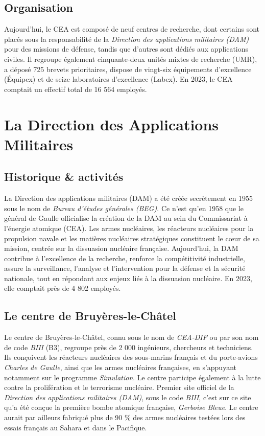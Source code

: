 \documentclass[12pt,a4paper]{report}
\begin{document}
\subsection{Organisation}
Aujourd'hui, le CEA est composé de neuf centres de recherche, dont certains sont placés sous la responsabilité de la \textit{Direction des applications militaires (DAM)} pour des missions de défense, tandis que d'autres sont dédiés aux applications civiles. Il regroupe également cinquante-deux unités mixtes de recherche (UMR), a déposé 725 brevets prioritaires, dispose de vingt-six équipements d’excellence (Équipex) et de seize laboratoires d’excellence (Labex). En 2023, le CEA comptait un effectif total de 16 564 employés.

\section{La Direction des Applications Militaires}
\subsection{Historique \& activités}
La Direction des applications militaires (DAM) a été créée secrètement en 1955 sous le nom de \textit{Bureau d'études générales (BEG)}. Ce n'est qu'en 1958 que le général de Gaulle officialise la création de la DAM au sein du Commissariat à l'énergie atomique (CEA). Les armes nucléaires, les réacteurs nucléaires pour la propulsion navale et les matières nucléaires stratégiques constituent le cœur de sa mission, centrée sur la dissuasion nucléaire française.
Aujourd'hui, la DAM contribue à l'excellence de la recherche, renforce la compétitivité industrielle, assure la surveillance, l'analyse et l'intervention pour la défense et la sécurité nationale, tout en répondant aux enjeux liés à la dissuasion nucléaire. En 2023, elle comptait près de 4 802 employés.
\subsection{Le centre de Bruyères-le-Châtel}
Le centre de Bruyères-le-Châtel, connu sous le nom de \textit{CEA-DIF} ou par son nom de code \textit{BIII} (B3), regroupe près de 2 000 ingénieurs, chercheurs et techniciens. Ils conçoivent les réacteurs nucléaires des sous-marins français et du porte-avions \textit{Charles de Gaulle}, ainsi que les armes nucléaires françaises, en s’appuyant notamment sur le programme \textit{Simulation}. Le centre participe également à la lutte contre la prolifération et le terrorisme nucléaire.
Premier site officiel de la \textit{Direction des applications militaires (DAM)}, sous le code \textit{BIII}, c’est sur ce site qu’a été conçue la première bombe atomique française, \textit{Gerboise Bleue}. Le centre aurait par ailleurs fabriqué plus de 90 \% des armes nucléaires testées lors des essais français au Sahara et dans le Pacifique.
\end{document}
